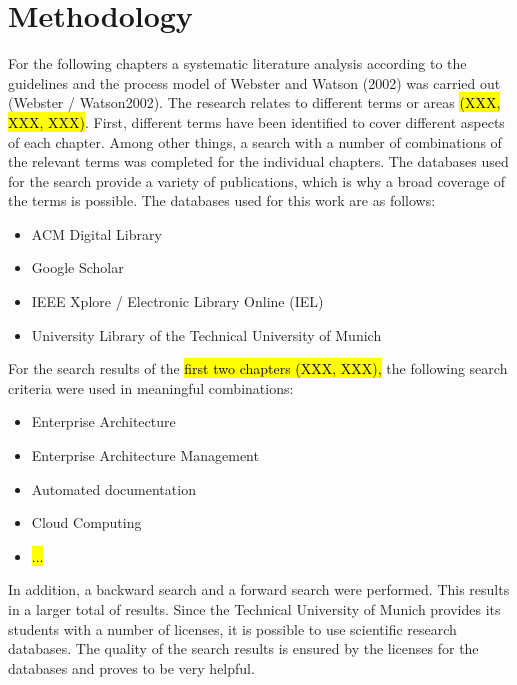 
\chapter{Methodology}\label{chapter:methodology}

For the following chapters a systematic literature analysis according to the guidelines and the process model of Webster and Watson (2002) was carried out (Webster / Watson2002). The research relates to different terms or areas \hl{(XXX, XXX, XXX)}. First, different terms have been identified to cover different aspects of each chapter. Among other things, a search with a number of combinations of the relevant terms was completed for the individual chapters.
The databases used for the search provide a variety of publications, which is why a broad coverage of the terms is possible. The databases used for this work are as follows:

\begin{itemize}
    \item ACM Digital Library
    \item Google Scholar
    \item IEEE Xplore / Electronic Library Online (IEL)
    \item University Library of the Technical University of Munich
\end{itemize}

For the search results of the \hl{ first two chapters (XXX, XXX),} the following search criteria were used in meaningful combinations:

\begin{itemize}
    \item Enterprise Architecture
    \item Enterprise Architecture Management
    \item Automated documentation
    \item Cloud Computing
    \item \hl{...}
    
\end{itemize}

In addition, a backward search and a forward search were performed. This results in a larger total of results. Since the Technical University of Munich provides its students with a number of licenses, it is possible to use scientific research databases. The quality of the search results is ensured by the licenses for the databases and proves to be very helpful.
